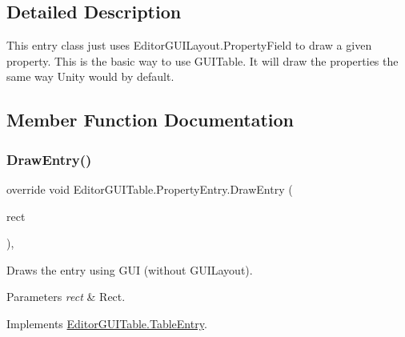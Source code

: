 \subsection{Detailed Description}
This entry class just uses Editor\+G\+U\+I\+Layout.\+Property\+Field to draw a given property. This is the basic way to use G\+U\+I\+Table. It will draw the properties the same way Unity would by default. 



\subsection{Member Function Documentation}
\mbox{\label{class_editor_g_u_i_table_1_1_property_entry_a176094e41cb53be100106c1d58763607}} 
\subsubsection{\texorpdfstring{Draw\+Entry()}{DrawEntry()}}
{\footnotesize\ttfamily override void Editor\+G\+U\+I\+Table.\+Property\+Entry.\+Draw\+Entry (\begin{DoxyParamCaption}\item[{Rect}]{rect }\end{DoxyParamCaption})\hspace{0.3cm}{\ttfamily [inline]}, {\ttfamily [virtual]}}



Draws the entry using G\+UI (without G\+U\+I\+Layout). 


\begin{DoxyParams}{Parameters}
{\em rect} & Rect.\\
\hline
\end{DoxyParams}


Implements \mbox{\hyperlink{class_editor_g_u_i_table_1_1_table_entry_ae02e641122da6dd161d61a20576812ca}{Editor\+G\+U\+I\+Table.\+Table\+Entry}}.

\mbox{\label{class_editor_g_u_i_table_1_1_property_entry_a5930e1e0e8cf4954cdbf25ef72e815f8}} 
